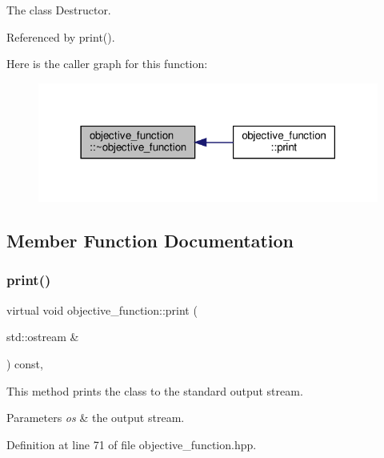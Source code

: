 The class Destructor. 



Referenced by print().

Here is the caller graph for this function\+:
\nopagebreak
\begin{figure}[H]
\begin{center}
\leavevmode
\includegraphics[width=318pt]{d0/da1/classobjective__function_afb5e36c983effd86b4f42c2ade3ac73a_icgraph}
\end{center}
\end{figure}


\subsection{Member Function Documentation}
\mbox{\label{classobjective__function_ab9fc88580b8980fd0c34e17e96a7e308}} 
\subsubsection{\texorpdfstring{print()}{print()}}
{\footnotesize\ttfamily virtual void objective\+\_\+function\+::print (\begin{DoxyParamCaption}\item[{std\+::ostream \&}]{ }\end{DoxyParamCaption}) const\hspace{0.3cm}{\ttfamily [inline]}, {\ttfamily [virtual]}}



This method prints the class to the standard output stream. 


\begin{DoxyParams}{Parameters}
{\em os} & the output stream. \\
\hline
\end{DoxyParams}


Definition at line 71 of file objective\+\_\+function.\+hpp.



